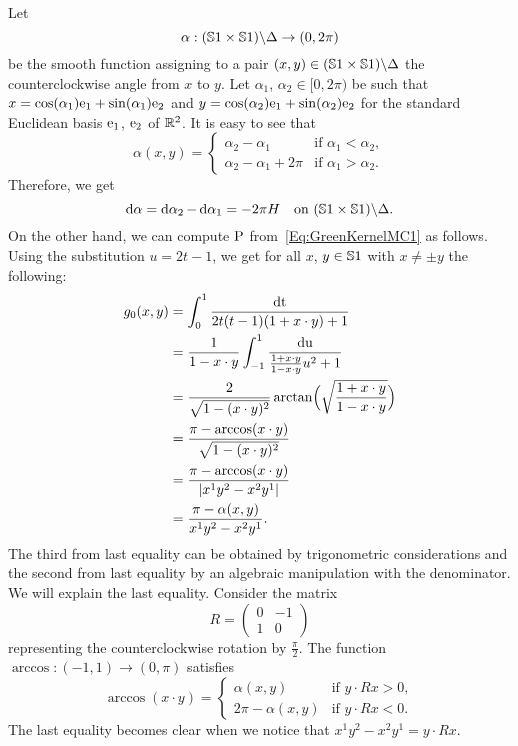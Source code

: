 \documentclass[\MainFolder/Text.tex]{subfiles}
\begin{document}
\begin{Example}\label{Example:Circle}%
\begin{ExampleList}
\item Let 
\[\alpha: (\mathbb{S}{1}\times\mathbb{S}{1})\backslash \Delta \rightarrow (0,2\pi)\]
be the smooth function assigning to a pair $(x,y)\in  (\mathbb{S}{1}\times\mathbb{S}{1})\backslash \Delta$ the counterclockwise angle from $x$ to $y$. Let $\alpha_1$, $\alpha_2 \in [0,2\pi)$ be such that $x=\cos(\alpha_1)\mathrm{e}_1 + \sin(\alpha_1)\mathrm{e}_2$ and $y=\cos(\alpha_2)\mathrm{e}_1+\sin(\alpha_2)\mathrm{e}_2$ for the standard Euclidean basis $\mathrm{e}_1$, $\mathrm{e}_2$ of $\mathbb{R}^2$. It is easy to see that
\[ \alpha(x,y) = \begin{cases} \alpha_2 - \alpha_1 & \text{if }\alpha_1<\alpha_2, \\
\alpha_2-\alpha_1+2\pi & \text{if }\alpha_1>\alpha_2. \end{cases} \]
Therefore, we get
\[ \operatorname{d\alpha} = \operatorname{d\alpha_2} -\operatorname{d\alpha_1} = -2\pi H \quad\text{on } (\mathbb{S}{1}\times\mathbb{S}{1})\backslash \Delta. \]
On the other hand, we can compute $\mathrm{P}$ from~\eqref{Eq:GreenKernelMC1} as follows. Using the substitution $u=2t-1$, we get for all $x$, $y\in \mathbb{S}{1}$ with $x\neq \pm y$ the following:
%
\begin{align*}
 g_{0}(x,y) &= \int_0^1 \frac{\operatorname{dt}}{2t(t-1)(1+x\cdot y) +1} \\
 & =  \frac{1}{1-x\cdot y}\int_{-1}^1 \frac{\operatorname{du}}{\frac{1+x\cdot y}{1- x\cdot y}u^2 + 1} \\
 & = \frac{2}{\sqrt{1-(x\cdot y)^2}}\arctan\Bigl(\sqrt{\frac{1+x\cdot y}{1-x\cdot y}}\Bigr) \\
 & = \frac{\pi - \arccos(x\cdot y)}{\sqrt{1-(x\cdot y)^2}} \\ 
 & = \frac{\pi - \arccos(x\cdot y)}{ |x^1 y^2 - x^2 y^1|} \\
 & = \frac{\pi - \alpha(x,y)}{x^1 y^2 - x^2 y^1}.
\end{align*}
The third from last equality can be obtained by trigonometric considerations and the second from last equality by an algebraic manipulation with the denominator. We will explain the last equality. Consider the matrix 
\[ R=\begin{pmatrix}
0 & -1 \\ 1 & 0
\end{pmatrix} \]
representing the counterclockwise rotation by $\frac{\pi}{2}$. The function $\arccos: (-1,1) \rightarrow (0,\pi)$ satisfies
\[ \arccos(x\cdot y) = \begin{cases}
                        \alpha(x,y) & \text{if }y\cdot Rx > 0, \\
                        2\pi - \alpha(x,y) & \text{if }y\cdot Rx<0. 
                       \end{cases}\]
The last equality becomes clear when we notice that $x^1 y^2 - x^2 y^1 = y\cdot Rx$. 


\end{ExampleList}
\end{Example}
\end{document}
